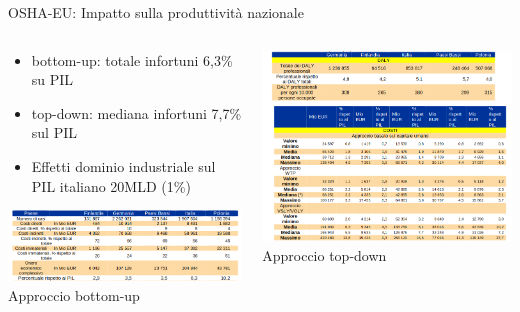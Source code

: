 \documentclass{beamer}
\begin{document}
\begin{frame}{OSHA-EU: Impatto sulla produttività nazionale}

  \begin{columns}  
    \begin{column}{0.5\textwidth}
      \begin{itemize}
	\item bottom-up: totale infortuni 6,3\% su PIL
	\item top-down: mediana infortuni 7,7\% sul PIL	
	\item Effetti dominio industriale sul PIL italiano 20MLD (1\%)
  \end{itemize}
      \centering
      \includegraphics[width=\textwidth]{images/onere_infortuni_ba.png}
      \vspace{2mm}
      \small{Approccio bottom-up}
    \end{column}

    \begin{column}{0.5\textwidth}
      \centering
      \includegraphics[width=\textwidth]{images/onere_infortuni_td.png}
      \vspace{2mm}
      \small{Approccio top-down}
    \end{column}
  \end{columns}
\end{frame}
\end{document}
